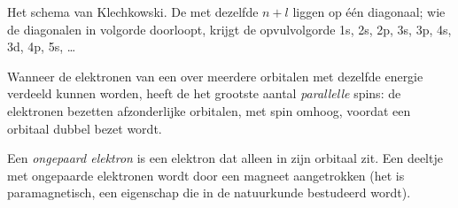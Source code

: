 \begin{omfigure}

{\small Het schema van Klechkowski. De  met dezelfde $n + l$
liggen op één diagonaal; wie de diagonalen in volgorde doorloopt, krijgt
de opvulvolgorde 1s, 2s, 2p, 3s, 3p, 4s, 3d, 4p, 5s, \dots}
\end{omfigure}

\begin{proposition}\label{prop:b1:quantum-numbers:hund}
Wanneer de elektronen van een  over meerdere orbitalen met
dezelfde energie verdeeld kunnen worden, heeft de  het
grootste aantal \emph{parallelle} spins: de elektronen bezetten
afzonderlijke orbitalen, met spin omhoog, voordat een orbitaal dubbel
bezet wordt.
\end{proposition}
\admitted

\begin{definition}\label{def:b1:quantum-numbers:unpaired}
Een \emph{ongepaard elektron} is een elektron
dat alleen in zijn orbitaal zit. Een deeltje met ongepaarde elektronen
wordt door een magneet aangetrokken (het is paramagnetisch, een
eigenschap die in de natuurkunde bestudeerd wordt).
\end{definition}

